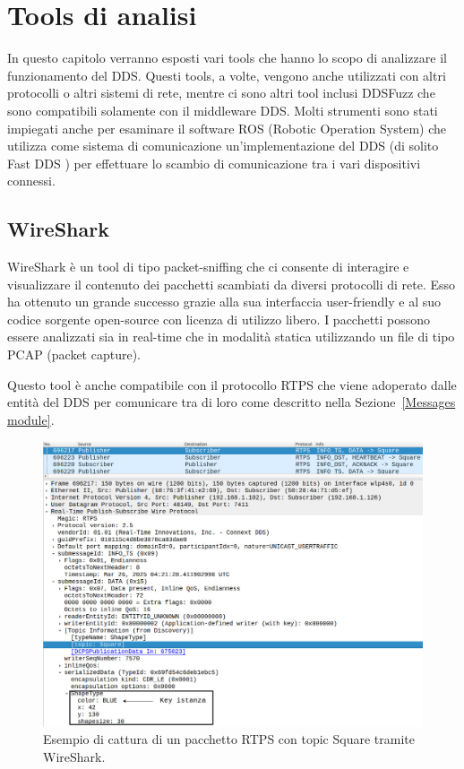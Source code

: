 \chapter{Tools di analisi}
\label{chtools}

In questo capitolo verranno esposti vari tools che hanno lo 
scopo di analizzare il funzionamento del DDS.
Questi tools,
a volte,
vengono anche utilizzati con altri protocolli o 
altri sistemi di rete, mentre ci sono altri tool inclusi DDSFuzz 
che sono compatibili solamente con il middleware DDS. Molti 
strumenti sono stati impiegati anche per esaminare il 
software ROS (Robotic Operation System) che utilizza come 
sistema di comunicazione un'implementazione del DDS 
(di solito Fast DDS \cite{FastDDS}) per effettuare lo scambio 
di comunicazione tra i vari dispositivi connessi.

\section{WireShark}
WireShark è un tool di tipo packet-sniffing che ci consente di 
interagire e visualizzare il contenuto dei pacchetti scambiati da 
diversi protocolli di rete. Esso ha ottenuto un grande successo 
grazie alla sua interfaccia user-friendly e al suo codice sorgente 
open-source con licenza di utilizzo libero. I pacchetti possono 
essere analizzati sia in real-time che in modalità statica utilizzando 
un file di tipo PCAP (packet capture). 

Questo tool è anche compatibile con il protocollo RTPS che viene
adoperato dalle entità del DDS per comunicare tra di loro 
come descritto nella Sezione~\ref{Messages module}.
\begin{figure}[H]
    \centering
    \includegraphics[width=15.2cm, keepaspectratio]{img/Info_ts e info_DST-Pagina-4.jpg}
    \caption{Esempio di cattura di un pacchetto RTPS con topic 
    Square tramite WireShark.}
    \label{wireskartshapesdemo}
\end{figure}

